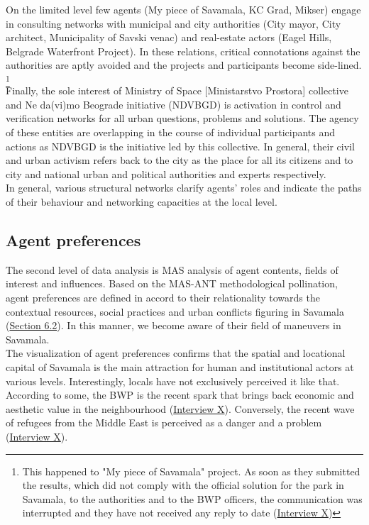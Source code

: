 \documentclass[11pt]{report}
\begin{document}
On the limited level few agents (My piece of Savamala, KC Grad, Mikser) engage in consulting networks with municipal and city authorities (City mayor, City architect, Municipality of Savski venac) and real-estate actors (Eagel Hills, Belgrade Waterfront Project).
In these relations, critical connotations against the authorities are aptly avoided and the projects and participants become side-lined.
\footnote{This happened to "My piece of Savamala" project.  As soon as they submitted the results, which did not comply with the official solution for the park in Savamala, to the authorities and to the BWP officers, the communication was interrupted and they have not received any reply to date
(\href{InterviewX}{Interview X})}
\\

Finally, the sole interest of Ministry of Space [Ministarstvo Prostora] collective and Ne da(vi)mo Beograde initiative (NDVBGD) is activation in control and verification networks for all urban questions, problems and solutions.
The agency of these entities are overlapping in the course of individual participants and actions as NDVBGD is the initiative led by this collective.
In general, their civil and urban activism refers back to the city as the place for all its citizens and to city and national urban and political authorities and experts respectively.
\\

In general, various structural networks clarify agents’ roles and indicate the paths of their behaviour and networking capacities at the local level.

\subsection{Agent preferences}

The second level of data analysis is MAS analysis of agent contents, fields of interest and influences.
Based on the MAS-ANT methodological pollination, agent preferences are defined in accord to their relationality towards the contextual resources, social practices and urban conflicts figuring in Savamala (\href{Section 6.2}{Section 6.2}).
In this manner, we become aware of their field of maneuvers in Savamala. 
\\

The visualization of agent preferences confirms that the spatial and locational capital of Savamala is the main attraction for human and institutional actors at various levels.
Interestingly, locals have not exclusively perceived it like that.
According to some, the BWP is the recent spark that brings back economic and aesthetic value in the neighbourhood
(\href{InterviewX}{Interview X}).
Conversely, the recent wave of refugees from the Middle East is perceived as a danger and a problem 
(\href{InterviewX}{Interview X}).
\\
\end{document}
